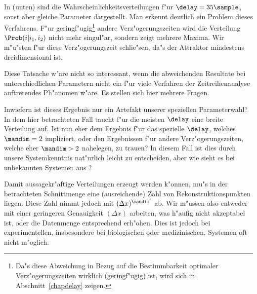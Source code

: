 In  (unten) sind die Wahrscheinlichkeitsverteilungen f"ur
$\delay=35\sample$, sonst aber gleiche Parameter dargestellt. Man erkennt deutlich ein
Problem dieses Verfahrens. F"ur geringf"ugig\footnote{Da"s diese Abweichung in Bezug auf
  die Bestimmbarkeit optimaler Verz"ogerungszeiten wirklich \begriff(geringf"ugig) ist,
  wird sich in Abschnitt~\ref{chapdelay} zeigen.} andere Verz"ogerungszeiten wird die
Verteilung $\Prob(i\vert i_1,i_2)$ nicht mehr singul"ar, sondern zeigt mehrere Maxima. Wir
m"u"sten f"ur diese Verz"ogerungszeit schlie"sen, da"s der Attraktor mindestens
dreidimensional ist.


Diese Tatsache w"are nicht so interessant, wenn die abweichenden Resultate bei
unterschiedlichen Parametern nicht ein f"ur viele Verfahren der Zeitreihenanalyse
auftretendes Ph"anomen w"are. Es stellen sich hier mehrere Fragen.
\begin{myitemize}
\item Inwiefern ist dieses Ergebnis nur ein Artefakt unserer speziellen Parameterwahl? In
  dem hier betrachteten Fall taucht f"ur die meisten $\delay$ eine breite Verteilung auf.
  Ist nun eher dem Ergebnis f"ur das spezielle $\delay$, welches $\mandim=2$ impliziert,
  oder den Ergebnissen f"ur andere Verz"ogerungszeiten, welche eher $\mandim>2$ nahelegen,
  zu trauen? In diesem Fall ist dies durch unsere Systemkenntnis nat"urlich leicht zu
  entscheiden, aber wie sieht es bei unbekannten Systemen aus ?
\item Damit aussagekr"aftige Verteilungen erzeugt werden k"onnen, mu"s in der
  betrachteten Schnittmenge eine \naja(ausreichende) Zahl von Rekonstruktionspunkten
  liegen. Diese Zahl nimmt jedoch mit $(\Delta x)^{\mandim'}$ ab. Wir m"ussen also
  entweder mit einer geringeren Genauigkeit $(\Delta x)$ arbeiten, was h"aufig nicht
  akzeptabel ist, oder die Datenmenge entsprechend erh"ohen. Dies ist jedoch bei
  experimentellen, insbesondere bei biologischen oder medizinischen, Systemen oft
  nicht m"oglich.
\end{myitemize}

